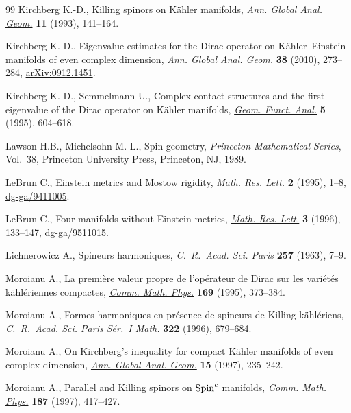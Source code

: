 \documentclass[pdftex]{sigma}
\numberwithin{equation}{section}
\theoremstyle{definition}
\begin{document}
\begin{thebibliography}{99}
Kirchberg K.-D., Killing spinors on {K}\"ahler manifolds, \href{http://dx.doi.org/10.1007/BF00773453}{\textit{Ann. Global
  Anal. Geom.}} \textbf{11} (1993), 141--164.

Kirchberg K.-D., Eigenvalue estimates for the {D}irac operator on
  {K}\"ahler--{E}instein manifolds of even complex dimension, \href{http://dx.doi.org/10.1007/s10455-010-9212-6}{\textit{Ann.
  Global Anal. Geom.}} \textbf{38} (2010), 273--284, \href{http://arxiv.org/abs/0912.1451}{arXiv:0912.1451}.

Kirchberg K.-D., Semmelmann U., Complex contact structures and the f\/irst
  eigenvalue of the {D}irac operator on {K}\"ahler manifolds, \href{http://dx.doi.org/10.1007/BF01895834}{\textit{Geom.
  Funct. Anal.}} \textbf{5} (1995), 604--618.

Lawson H.B., Michelsohn M.-L., Spin geometry, \textit{Princeton Mathematical
  Series}, Vol.~38, Princeton University Press, Princeton, NJ, 1989.

LeBrun C., Einstein metrics and {M}ostow rigidity, \href{http://dx.doi.org/10.4310/MRL.1995.v2.n1.a1}{\textit{Math. Res. Lett.}}
  \textbf{2} (1995), 1--8, \href{http://arxiv.org/abs/dg-ga/9411005}{dg-ga/9411005}.

LeBrun C., Four-manifolds without {E}instein metrics, \href{http://dx.doi.org/10.4310/MRL.1996.v3.n2.a1}{\textit{Math. Res. Lett.}}
  \textbf{3} (1996), 133--147, \href{http://arxiv.org/abs/dg-ga/9511015}{dg-ga/9511015}.

Lichnerowicz A., Spineurs harmoniques, \textit{C.~R.~Acad. Sci. Paris}
  \textbf{257} (1963), 7--9.

Moroianu A., La premi\`ere valeur propre de l'op\'erateur de {D}irac sur les
  vari\'et\'es k\"ahl\'eriennes compactes, \href{http://dx.doi.org/10.1007/BF02099477}{\textit{Comm. Math. Phys.}}
  \textbf{169} (1995), 373--384.

Moroianu A., Formes harmoniques en pr\'esence de spineurs de {K}illing
  k\"ahl\'eriens, \textit{C.~R.~Acad. Sci. Paris S\'er.~I Math.} \textbf{322}
  (1996), 679--684.

Moroianu A., On {K}irchberg's inequality for compact {K}\"ahler manifolds of
  even complex dimension, \href{http://dx.doi.org/10.1023/A:1006543304443}{\textit{Ann. Global Anal. Geom.}} \textbf{15} (1997),
  235--242.

Moroianu A., Parallel and {K}illing spinors on {${\rm Spin}^c$} manifolds,
  \href{http://dx.doi.org/10.1007/s002200050142}{\textit{Comm. Math. Phys.}} \textbf{187} (1997), 417--427.


\end{thebibliography}
\end{document}
